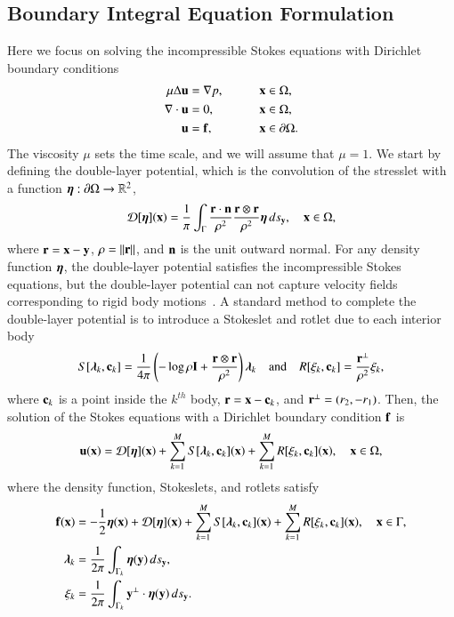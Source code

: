 \documentclass[preprint, 10pt]{elsarticle}
\begin{document}
\subsection{Boundary Integral Equation Formulation} 
\label{sec:bies}
Here we focus on solving the incompressible Stokes equations with
Dirichlet boundary conditions
\begin{alignat*}{3}
  \mu\Delta {\mathbf{u}} &= {\nabla} p, \qquad && {\mathbf{x}} \in \Omega, \\
  {\nabla} \cdot {\mathbf{u}} &= 0,   && {\mathbf{x}} \in \Omega, \\
  {\mathbf{u}} &= {\mathbf{f}},  && {\mathbf{x}} \in {\partial}\Omega.
\end{alignat*}
The viscosity $\mu$ sets the time scale, and we will assume that
$\mu=1$.  We start by defining the double-layer potential, which is the
convolution of the stresslet with a function ${\boldsymbol\eta}:{\partial}\Omega
\rightarrow {\mathbb{R}}^2$,
\begin{align}
  {\mathcal{D}}[{\boldsymbol\eta}]({\mathbf{x}}) = \frac{1}{\pi} \int_{\Gamma} 
    \frac{{\mathbf{r}} \cdot {\mathbf{n}}}{\rho^2} \frac{{\mathbf{r}} \otimes {\mathbf{r}}}{\rho^2} 
    {\boldsymbol\eta} \, ds_{\mathbf{y}}, \quad {\mathbf{x}} \in \Omega,
    \label{eqn:velocityDLP}
\end{align}
where ${\mathbf{r}} = {\mathbf{x}} - {\mathbf{y}}$, $\rho = \|{\mathbf{r}}\|$, and ${\mathbf{n}}$ is the unit outward
normal.  For any density function ${\boldsymbol\eta}$, the double-layer potential
satisfies the incompressible Stokes equations, but the double-layer
potential can not capture velocity fields corresponding to rigid body
motions~\cite{pow-mir1987}.  A standard method to complete the
double-layer potential is to introduce a Stokeslet and rotlet due to
each interior body
\begin{align}
  S[{\boldsymbol\lambda}_k,{\mathbf{c}}_k] = \frac{1}{4\pi} \left(-\log \rho {\mathbf{I}} + 
    \frac{{\mathbf{r}} \otimes {\mathbf{r}}}{\rho^2} \right){\boldsymbol\lambda}_k
  \quad \text{and} \quad
  R[\xi_k,{\mathbf{c}}_k] = \frac{{\mathbf{r}}^\perp}{\rho^2}\xi_k,
  \label{eqn:stokeslet_rotlet}
\end{align}
where ${\mathbf{c}}_k$ is a point inside the $k^{th}$ body,  ${\mathbf{r}} = {\mathbf{x}} - {\mathbf{c}}_k$,
and ${\mathbf{r}}^\perp = (r_2,-r_1)$.  Then, the solution of the Stokes
equations with a Dirichlet boundary condition ${\mathbf{f}}$ is
\begin{align}
  \label{eqn:completed_DLP}
  {\mathbf{u}}({\mathbf{x}}) = {\mathcal{D}}[{\boldsymbol\eta}]({\mathbf{x}}) + \sum_{k=1}^{M} S[{\boldsymbol\lambda}_k,{\mathbf{c}}_k]({\mathbf{x}}) +
              \sum_{k=1}^{M} R[\xi_k,{\mathbf{c}}_k]({\mathbf{x}}), \quad {\mathbf{x}} \in \Omega,
\end{align}
where the density function, Stokeslets, and rotlets satisfy
\begin{subequations}
\label{eqn:completed_BIE}
\begin{align}
  {\mathbf{f}}({\mathbf{x}}) &= -\frac{1}{2}{\boldsymbol\eta}({\mathbf{x}}) + {\mathcal{D}}[{\boldsymbol\eta}]({\mathbf{x}}) + 
      \sum_{k=1}^{M} S[{\boldsymbol\lambda}_k,{\mathbf{c}}_k]({\mathbf{x}}) +
      \sum_{k=1}^{M} R[\xi_k,{\mathbf{c}}_k]({\mathbf{x}}), \quad {\mathbf{x}} \in \Gamma, 
      \label{eqn:DLP}\\
  {\boldsymbol\lambda}_k &= \frac{1}{2\pi}\int_{\Gamma_k} {\boldsymbol\eta}({\mathbf{y}}) \, ds_{\mathbf{y}}, 
  \label{eqn:stokeslet} \\
  \xi_k &= \frac{1}{2\pi}\int_{\Gamma_k} {\mathbf{y}}^\perp \cdot {\boldsymbol\eta}({\mathbf{y}})
  \, ds_{\mathbf{y}}.
  \label{eqn:rotlet}
\end{align}
\end{subequations}
\end{document}
